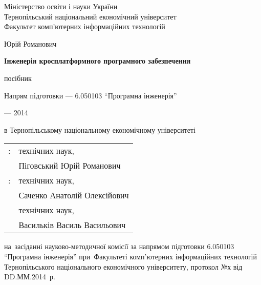 \fontsize{14pt}{15pt}\selectfont  %
\thispagestyle{empty}

\vspace{10mm}
\begin{center}
  Міністерство освіти і науки України \\
Тернопільський національний економічний університет \\
Факультет комп'ютерних інформаційних технологій
\end{center}

\vspace{30mm}
\begin{center}
{\Large{} Юрій Романович}
\end{center}

\vspace{30mm}
\begin{center}
{\bf \LARGE Інженерія кросплатформного програмного забезпечення
\par}

\vspace{15mm}
 посібник

\vspace{30mm}
{\Large
Напрям підготовки --- 6.050103 ``Програмна інженерія''
}


\end{center}

\vspace{40mm}
\begin{center}
{ --- 2014}
\end{center}

\newpage

 в Тернопільському національному економічному університеті
\vspace{10mm}
\begin{table} [h]  
  \begin{tabular}{ll}
  \fontsize{14pt}{15pt}: & \fontsize{14pt}{15pt} технічних наук,                     \\
                        & \fontsize{14pt}{15pt} Піговський Юрій Романович
\vspace{3mm} \\
  \fontsize{14pt}{15pt}:& \fontsize{14pt}{15pt} технічних наук,                     \\
                        & \fontsize{14pt}{15pt} Саченко Анатолій Олексійович \vspace{1mm}         \\
                        & \fontsize{14pt}{15pt} технічних наук,                    \\
                        & \fontsize{14pt}{15pt} Васильків Василь Васильович \vspace{3mm}                
  \end{tabular}  
\end{table}

\vspace{20mm}
 на~засіданні науково-методичної комісії за напрямом підготовки \mbox{6.050103} ``Програмна інженерія'' при~Факультеті комп'ютерних інформаційних технологій Тернопільського національного економічного університету, протокол №х від DD.ММ.2014~р.


